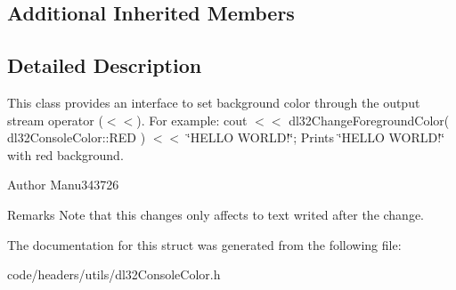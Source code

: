 \subsection*{Additional Inherited Members}


\subsection{Detailed Description}
This class provides an interface to set background color through the output stream operator ($<$$<$). For example\-: cout $<$$<$ dl32\-Change\-Foreground\-Color( dl32\-Console\-Color\-::\-R\-E\-D ) $<$$<$ \char`\"{}\-H\-E\-L\-L\-O W\-O\-R\-L\-D!\char`\"{}; Prints \char`\"{}\-H\-E\-L\-L\-O W\-O\-R\-L\-D!\char`\"{} with red background. 

\begin{DoxyAuthor}{Author}
Manu343726
\end{DoxyAuthor}
\begin{DoxyRemark}{Remarks}
Note that this changes only affects to text writed after the change. 
\end{DoxyRemark}


The documentation for this struct was generated from the following file\-:\begin{DoxyCompactItemize}
\item 
code/headers/utils/dl32\-Console\-Color.\-h\end{DoxyCompactItemize}
